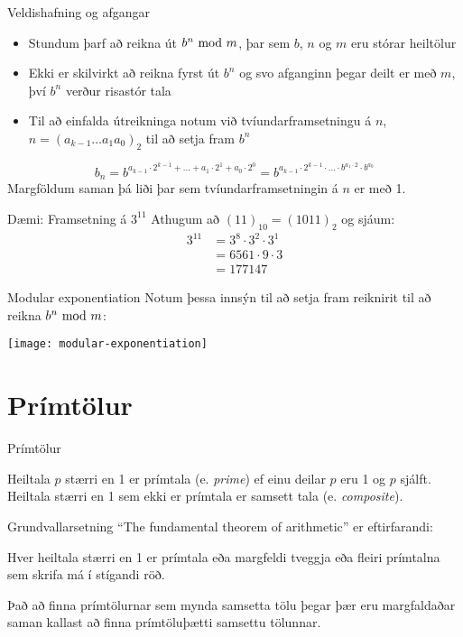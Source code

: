 \documentclass[handout]{beamer}
\begin{document}
\begin{frame}{Veldishafning og afgangar}
\begin{itemize}
 \item Stundum þarf að reikna út $b^n \ \text{mod}\ m$, þar sem $b$, $n$ og $m$ eru stórar heiltölur
 \item Ekki er skilvirkt að reikna fyrst út $b^n$ og svo afganginn þegar deilt er með $m$, því $b^n$ verður risastór tala
 \item Til að einfalda útreikninga notum við tvíundarframsetningu á $n$, $n = (a_{k-1}\ldots a_1 a_0)_2$ til að setja fram $b^n$
\end{itemize}
\[
 b_n = b^{a_{k-1}\cdot 2^{k-1} + \ldots + a_1\cdot 2^1 + a_0 \cdot 2^0} = b^{a_{k-1}\cdot2^{k-1}\cdot \ldots \cdot b^{a_1\cdot 2} \cdot b^{a_0}}
\]
Margföldum saman þá liði þar sem tvíundarframsetningin á $n$ er með 1.
\end{frame}

\begin{frame}{Dæmi: Framsetning á $3^{11}$}
Athugum að $(11)_{10} = (1011)_2$ og sjáum:
\begin{align*}
3^{11} &= 3^8\cdot 3^2 \cdot 3^1\\
&=6561 \cdot 9 \cdot 3\\
&=177147
\end{align*}

\end{frame}

\begin{frame}{Modular exponentiation}
Notum þessa innsýn til að setja fram reiknirit til að reikna $b^n \ \text{mod}\ m$:
\begin{center}
\texttt{[image: modular-exponentiation]}
\end{center}
\end{frame}

\section{Prímtölur}

\begin{frame}{Prímtölur}
\begin{tcolorbox}[title=Prímtölur]
Heiltala $p$ stærri en 1 er prímtala (e. \emph{prime}) ef einu deilar $p$ eru 1 og $p$ sjálft. Heiltala stærri en 1 sem ekki er prímtala er samsett tala (e. \emph{composite}).
\end{tcolorbox}
\end{frame}


\begin{frame}{Grundvallarsetning}
``The fundamental theorem of arithmetic'' er eftirfarandi:

\begin{tcolorbox}[title=Fundamental theorem of arithmetic]
Hver heiltala stærri en 1 er prímtala eða margfeldi tveggja eða fleiri prímtalna sem skrifa má í stígandi röð.
\end{tcolorbox}

Það að finna prímtölurnar sem mynda samsetta tölu þegar þær eru margfaldaðar saman kallast að finna prímtöluþætti samsettu tölunnar.
\end{frame}
\end{document}
